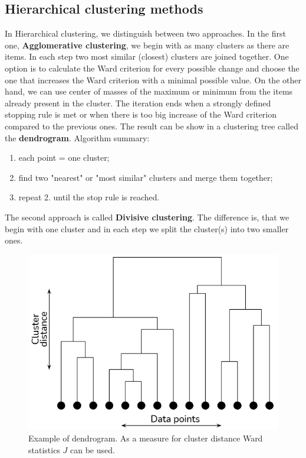 \subsection{Hierarchical clustering methods}
In Hierarchical clustering, we distinguish between two approaches. In the first one, \textbf{Agglomerative clustering}, we begin with as many clusters as there are items. In each step two most similar (closest) clusters are joined together. One option is to calculate the Ward criterion for every possible change and choose the one that increases the Ward criterion with a minimal possible value. On the other hand, we can use center of masses of the maximum or minimum from the items already present in the cluster. The iteration ends when a strongly defined stopping rule is met or when there is too big increase of the Ward criterion compared to the previous ones. The result can be show in a clustering tree called the \textbf{dendrogram}. Algorithm summary:
\begin{enumerate}
	\item each point = one cluster;
	\item find two "nearest" or "most similar" clusters and merge them together;
	\item repeat 2. until the stop rule is reached. 
\end{enumerate}

The second approach is called \textbf{Divisive clustering}. The difference is, that we begin with one cluster and in each step we split the cluster(s) into two smaller ones.\\

\begin{figure}[h]
	\centering
	\includegraphics[scale=0.5]{dendrogram.png}
	\caption{Example of dendrogram. As a measure for cluster distance Ward statistics $J$ can be used.}
\end{figure}
